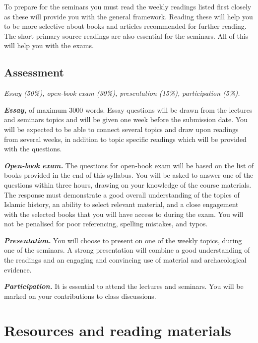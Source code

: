 \documentclass[
]{book}
\begin{document}
To prepare for the seminars you must read the weekly readings listed first closely as these will provide you with the general framework. Reading these will help you to be more selective about books and articles recommended for further reading. The short primary source readings are also essential for the seminars. All of this will help you with the exams.

\hypertarget{assessment}{%
\subsection*{Assessment}\label{assessment}}

\emph{Essay (50\%), open-book exam (30\%), presentation (15\%), participation (5\%).}

\textbf{\emph{Essay,}} of maximum 3000 words. Essay questions will be drawn from the lectures and seminars topics and will be given one week before the submission date. You will be expected to be able to connect several topics and draw upon readings from several weeks, in addition to topic specific readings which will be provided with the questions.

\textbf{\emph{Open-book exam.}} The questions for open-book exam will be based on the list of books provided in the end of this syllabus. You will be asked to answer one of the questions within three hours, drawing on your knowledge of the course materials. The response must demonstrate a good overall understanding of the topics of Islamic history, an ability to select relevant material, and a close engagement with the selected books that you will have access to during the exam. You will not be penalised for poor referencing, spelling mistakes, and typos.

\textbf{\emph{Presentation.}} You will choose to present on one of the weekly topics, during one of the seminars. A strong presentation will combine a good understanding of the readings and an engaging and convincing use of material and archaeological evidence.

\textbf{\emph{Participation.}} It is essential to attend the lectures and seminars. You will be marked on your contributions to class discussions.

\hypertarget{resources-and-reading-materials}{%
\section*{Resources and reading materials}\label{resources-and-reading-materials}}
\end{document}
